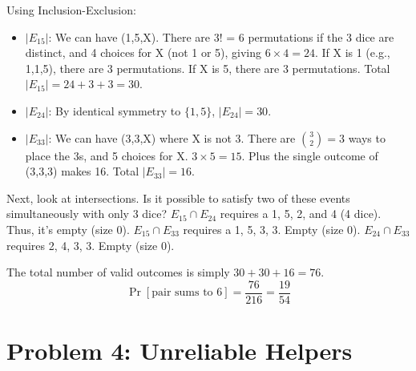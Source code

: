 \documentclass[11pt]{article}
\begin{document}
\begin{enumerate}[label=\textbf{(\alph*)}]
    Using Inclusion-Exclusion:
    \begin{itemize}
        \item $|E_{15}|$: We can have (1,5,X). There are 3! = 6 permutations if the 3 dice are distinct, and 4 choices for X (not 1 or 5), giving $6 \times 4 = 24$. If X is 1 (e.g., 1,1,5), there are 3 permutations. If X is 5, there are 3 permutations. Total $|E_{15}| = 24 + 3 + 3 = 30$.
        \item $|E_{24}|$: By identical symmetry to $\{1,5\}$, $|E_{24}| = 30$.
        \item $|E_{33}|$: We can have (3,3,X) where X is not 3. There are $\binom{3}{2} = 3$ ways to place the 3s, and 5 choices for X. $3 \times 5 = 15$. Plus the single outcome of (3,3,3) makes 16. Total $|E_{33}| = 16$.
    \end{itemize}
    Next, look at intersections. Is it possible to satisfy two of these events simultaneously with only 3 dice? 
    $E_{15} \cap E_{24}$ requires a 1, 5, 2, and 4 (4 dice). Thus, it's empty (size 0).
    $E_{15} \cap E_{33}$ requires a 1, 5, 3, 3. Empty (size 0).
    $E_{24} \cap E_{33}$ requires 2, 4, 3, 3. Empty (size 0).
    
    The total number of valid outcomes is simply $30 + 30 + 16 = 76$. 
    $$ \Pr[\text{pair sums to 6}] = \frac{76}{216} = \frac{19}{54} $$
\end{enumerate}

\vspace{0.5cm}

\section*{Problem 4: Unreliable Helpers}
\end{document}
